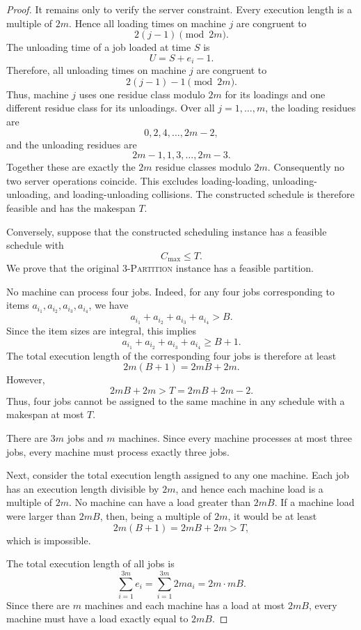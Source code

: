 \documentclass[11pt]{article}
\begin{document}
\begin{proof}
It remains only to verify the server constraint. Every execution length is a
multiple of \(2m\). Hence all loading times on machine \(j\) are congruent to
\[
        2(j-1) \pmod{2m}.
\]
The unloading time of a job loaded at time \(S\) is
\[
        U=S+e_i-1.
\]
Therefore, all unloading times on machine \(j\) are congruent to
\[
        2(j-1)-1 \pmod{2m}.
\]
Thus, machine \(j\) uses one residue class modulo \(2m\) for its loadings and one
different residue class for its unloadings. Over all \(j=1,\ldots,m\), the
loading residues are
\[
        0,2,4,\ldots,2m-2,
\]
and the unloading residues are
\[
        2m-1,1,3,\ldots,2m-3.
\]
Together these are exactly the \(2m\) residue classes modulo \(2m\). Consequently
no two server operations coincide. This excludes loading-loading,
unloading-unloading, and loading-unloading collisions. The constructed schedule
is therefore feasible and has the makespan \(T\).

Conversely, suppose that the constructed scheduling instance has a feasible
schedule with
\[
        C_{\max}\le T.
\]
We prove that the original \textsc{3-Partition} instance has a feasible
partition.

No machine can process four jobs. Indeed, for any four jobs corresponding to
items \(a_{i_1},a_{i_2},a_{i_3},a_{i_4}\), we have
\[
        a_{i_1}+a_{i_2}+a_{i_3}+a_{i_4}>B.
\]
Since the item sizes are integral, this implies
\[
        a_{i_1}+a_{i_2}+a_{i_3}+a_{i_4}\ge B+1.
\]
The total execution length of the corresponding four jobs is therefore at least
\[
        2m(B+1)=2mB+2m.
\]
However, 
\[
        2mB+2m>T=2mB+2m-2.
\]
Thus, four jobs cannot be assigned to the same machine in any schedule with a 
makespan at most \(T\).

There are \(3m\) jobs and \(m\) machines. Since every machine processes at most
three jobs, every machine must process exactly three jobs.

Next, consider the total execution length assigned to any one machine. Each job
has an execution length divisible by \(2m\), and hence each machine load is a
multiple of \(2m\). No machine can have a load greater than \(2mB\). If a machine
load were larger than \(2mB\), then, being a multiple of \(2m\), it would be at
least
\[
        2m(B+1)=2mB+2m>T,
\]
which is impossible.

The total execution length of all jobs is
\[
        \sum_{i=1}^{3m} e_i
        =
        \sum_{i=1}^{3m}2m a_i
        =
        2m\cdot mB .
\]
Since there are \(m\) machines and each machine has a load at most \(2mB\), every
machine must have a load exactly equal to \(2mB\).


\end{proof}
\end{document}
